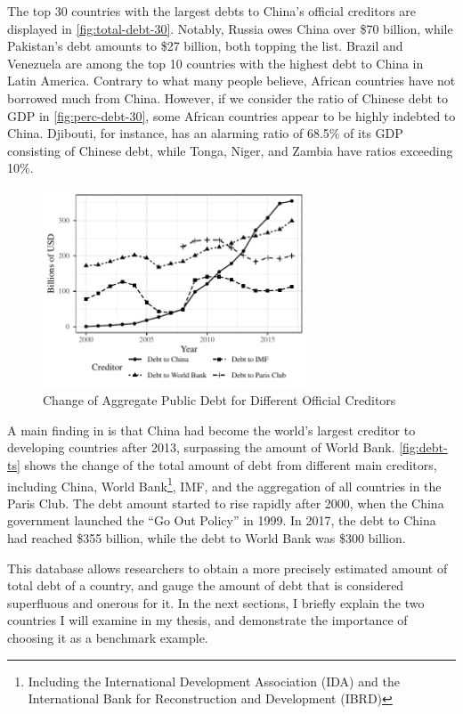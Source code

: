 The top 30 countries with the largest debts to China's official creditors are displayed in \autoref{fig:total-debt-30}. Notably, Russia owes China over \$70 billion, while Pakistan's debt amounts to \$27 billion, both topping the list. Brazil and Venezuela are among the top 10 countries with the highest debt to China in Latin America. Contrary to what many people believe, African countries have not borrowed much from China. However, if we consider the ratio of Chinese debt to GDP in \autoref{fig:perc-debt-30}, some African countries appear to be highly indebted to China. Djibouti, for instance, has an alarming ratio of 68.5\% of its GDP consisting of Chinese debt, while Tonga, Niger, and Zambia have ratios exceeding 10\%.
\begin{figure}
    \centering
    \includegraphics[width = 0.7\textwidth]{fig/aggr_debt_source.pdf}
    \caption{Change of Aggregate Public Debt for Different Official Creditors}
    \label{fig:debt-ts}
\end{figure}

A main finding in \citet*{Horn-Reinhart-Trebesch-21} is that China had become the world's largest creditor to developing countries after 2013, surpassing the amount of World Bank. \autoref{fig:debt-ts} shows the change of the total amount of debt from different main creditors, including China, World Bank\footnote{Including the International Development Association (IDA) and the International Bank for Reconstruction and Development (IBRD) }, IMF, and the aggregation of all countries in the Paris Club. The debt amount started to rise rapidly after 2000, when the China government launched the ``Go Out Policy'' in 1999. In 2017, the debt to China had reached \$355 billion, while the debt to World Bank was \$300 billion.


This database allows researchers to obtain a more precisely estimated amount of total debt of a country, and gauge the amount of debt that is considered superfluous and onerous for it.
In the next sections, I briefly explain the two countries I will examine in my thesis, and demonstrate the importance of choosing it as a benchmark example.